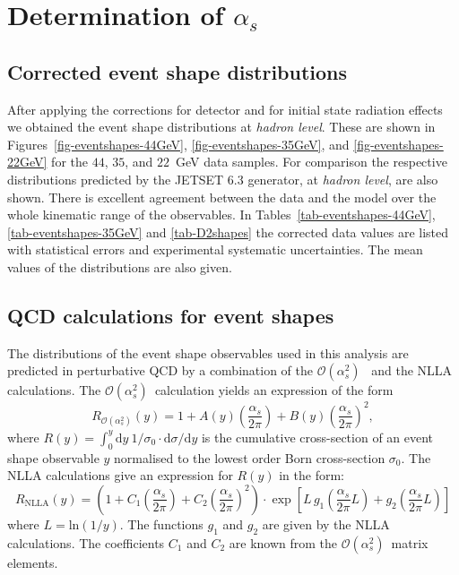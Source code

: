 \documentclass[12pt,a4paper,twoside]{article}
\newcommand{\as}     {\ensuremath{\alpha_s}}
\newcommand{\oaa}    {\ensuremath{\mathcal{O}(\alpha_s^2)}}
\begin{document}
\section{ Determination of \as }
\label{sec-alphas}
\subsection{ Corrected event shape distributions}
After applying the corrections for detector and for initial state radiation 
effects we obtained the event shape distributions at {\em hadron level}. 
These are shown in Figures~\ref{fig-eventshapes-44GeV}, 
\ref{fig-eventshapes-35GeV}, and \ref{fig-eventshapes-22GeV} 
for the $44$, $35$, and $22$~GeV data samples.
For comparison the respective 
distributions predicted by the JETSET 6.3 generator, at {\em hadron level}, 
are also shown.
There is excellent agreement between the data and the model over the
whole kinematic range of the observables.
In Tables~\ref{tab-eventshapes-44GeV}, \ref{tab-eventshapes-35GeV} and
\ref{tab-D2shapes} the corrected data values are listed with
statistical errors and experimental systematic uncertainties. The 
mean values of the distributions are also given.

\subsection{ QCD calculations for event shapes}
The distributions of the
event shape observables used in this analysis
are predicted in perturbative QCD by a 
combination of the \oaa~\cite{bib-ERT} and the
NLLA~\cite{bib-NLLA-1,bib-NLLA-2,bib-NLLA-3} calculations.
The \oaa\ calculation yields an
expression of the form 
\begin{displaymath}
    R_{\oaa}(y) = 1 + A(y)\left(\frac{\as}{2\pi}\right) 
                    + B(y)\left(\frac{\as}{2\pi}\right)^2,
\end{displaymath}
where 
$R(y) = \int_{0}^{y} {{\mathrm{d}} y}\ 1/\sigma_0 \cdot 
        {{\mathrm{d}}}\sigma/{{\mathrm{d}}y}$
is the cumulative cross-section of an event shape 
observable $y$
normalised to the lowest order Born cross-section $\sigma_0$. 
The NLLA calculations
give an expression for $R(y)$ in the form:
\begin{displaymath}
R_{\mathrm{NLLA}}(y) = \left(1 + C_1\left(\frac{\as}{2\pi}\right) 
                               + C_2\left(\frac{\as}{2\pi}\right) ^2\right) 
                       \cdot
                       \exp\left[L\, g_1\!\left(\frac{\as}{2\pi} L\right)
                                 +   g_2\!\left(\frac{\as}{2\pi} L\right)\right]
\end{displaymath}
where $L = {\mathrm{ln}}(1/y)$. The functions $g_1$ and $g_2$ are given by
the NLLA calculations. The coefficients $C_1$ and $C_2$ are known from the
\oaa\ matrix elements.
\end{document}
